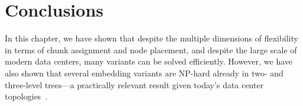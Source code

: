 \section{Conclusions}\label{sec:conclusion-static}


In this chapter, we have shown that despite the
multiple dimensions of flexibility in terms of chunk assignment and node placement, 
and despite the large scale of modern data centers, 
many variants can be solved efficiently. However, we have also
shown that several embedding variants are NP-hard already in two-
and three-level trees---a practically relevant result given today's data center topologies~\cite{fattree}.




